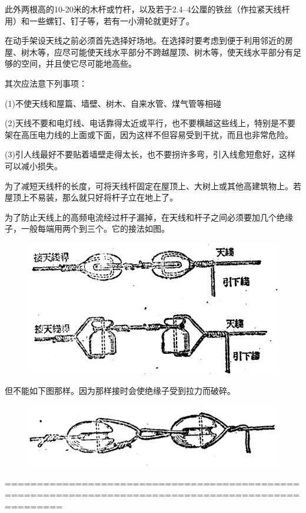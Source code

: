 \documentclass[12pt,UTF8]{ctexbook}
\begin{document}
此外两根高的10-20米的木杆或竹杆，以及若于2.4--4公厘的铁丝（作拉紧天线杆用）和一些螺钉、钉子等，若有一小滑轮就更好了。

在动手架设天线之前必须首先选择好场地。在选择时要考虑到便于利用邻近的房屋、树木等，应尽可能使天线水平部分不跨越屋顶、树木等，使天线水平部分有足够的空间，并且使它尽可能地高些。

其次应法意下列事项：

(1)不使天线和屋篇、墙壁、树木、自来水管、煤气管等相碰

(2)天线不要和电灯线、电话靠得太近或平行，也不要横越这些线上，特别是不要架在高压电力线的上面或下面，因为这样不但容易受到干扰，而且也非常危险。

(3)引人线最好不要贴着墙壁走得太长，也不要拐许多弯，引入线愈短愈好，这样可以减小损失。

为了减短天线杆的长度，可将天线杆固定在屋顶上、大树上或其他高建筑物上。若屋顶上不易装，那么就只好将杆子立在地上了。

为了防止天线上的高频电流经过杆子漏掉，在天线和杆子之间必须要加几个绝缘子，一般每端用两个到三个。它的接法如图。

\begin{figure}[htbp]
	\centering
	\includegraphics[width=0.7\linewidth]{11}
	\caption{}
	\label{fig:1}
\end{figure}

但不能如下图那样。因为那样接时会使绝缘子受到拉力而破碎。

\begin{figure}[htbp]
	\centering
	\includegraphics[width=0.7\linewidth]{12}
	\caption{}
	\label{fig:1}
\end{figure}

=====================================================================================================
\end{document}
